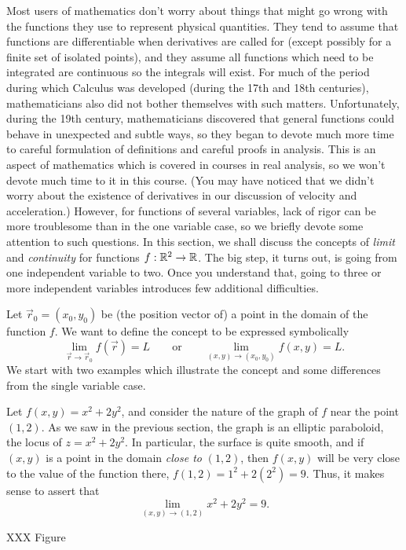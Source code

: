 Most users of mathematics don't worry about things that might
go wrong with the functions they use to represent physical quantities.
They tend to assume that  functions  are differentiable when derivatives
are called for  (except possibly for a finite set of isolated points),
and they assume all functions which need to be integrated are continuous
so the integrals will exist.   For much of the period during which
Calculus was developed (during the 17th and 18th centuries), mathematicians
also did not bother themselves with such matters.   Unfortunately,
during the 19th century, mathematicians discovered that general
functions could behave in  unexpected and subtle ways, so they began to 
devote much more time to careful formulation of definitions and careful
proofs in analysis.   This is an aspect of mathematics which is
covered in courses in real analysis, so we won't devote much time
to it in this course.  (You may have noticed that we didn't worry
about the existence of derivatives in our discussion of
velocity and acceleration.)  However, 
for functions of several variables,
lack of rigor can be more troublesome than in
the one variable case,  so we briefly devote some attention to such
questions.
 In this section, we shall discuss the concepts
of \emph{limit} and \emph{continuity} for functions $f:\mathbb{R}^2 \to \mathbb{R}$.
The big step, it turns out, is going from one independent 
variable to two.
Once you understand that, going to three or more
independent variables introduces
few additional difficulties.

Let  $\vec r_0 = ( x_0, y_0 )$ be (the position vector of) a point
in the domain of the function $f$.   We want to define the
concept to be expressed symbolically
\[
    \lim_{\vec r \to \vec r_0} f(\vec r) = L \qquad\text{or}\qquad 
   \lim_{(x,y)\to (x_0,y_0)} f(x,y) = L.
\]
We start with two examples which illustrate the concept and some
differences from the single variable case.

\begin{example}
	\label{EXCONTLIMIT}
	Let $f(x,y) = x^2 + 2y^2$, and consider the
	nature of the graph of $f$  near the point $(1,2)$.  As
	we saw in the previous section, the graph is an elliptic paraboloid,
	the locus of $z = x^2 + 2y^2$.
	In particular, the surface is quite smooth, and if $(x,y)$ is
	a point in the domain \emph{close to} $(1,2)$, then $f(x,y)$
	will be very close to the value of the function there, $f(1,2) =
	1^2 + 2(2^2) = 9$.   Thus, it makes sense to assert that
	\[
	 \lim_{(x,y)\to (1,2)} x^2 + 2y^2 = 9.
	\]

	XXX Figure
\end{example}

